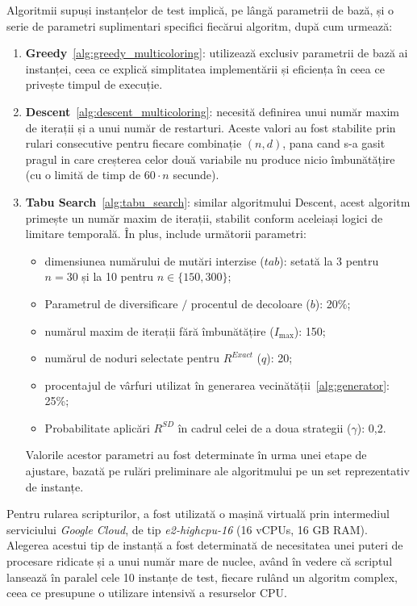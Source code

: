 Algoritmii supuși instanțelor de test implică, pe lângă parametrii de bază, și o serie de parametri suplimentari specifici fiecărui algoritm, după cum urmează:
\begin{enumerate}
  \item \textbf{Greedy}~\ref{alg:greedy_multicoloring}: utilizează exclusiv parametrii de bază ai instanței, ceea ce explică simplitatea implementării și eficiența în ceea ce privește timpul de execuție.

  \item \textbf{Descent}~\ref{alg:descent_multicoloring}: necesită definirea unui număr maxim de iterații și a unui număr de restarturi. Aceste valori au fost stabilite prin rulari consecutive pentru fiecare combinație $(n,d)$, pana cand s-a gasit pragul in care creșterea celor două variabile nu produce nicio îmbunătățire (cu o limită de timp de $60 \cdot n$ secunde).
  \item \textbf{Tabu Search}~\ref{alg:tabu_search}: similar algoritmului Descent, acest algoritm primește un număr maxim de iterații, stabilit conform aceleiași logici de limitare temporală. În plus, include următorii parametri:
  \begin{itemize}
    \item dimensiunea numărului de mutări interzise ($tab$): setată la 3 pentru $n = 30$ și la 10 pentru $n \in \{150, 300\}$;
    \item Parametrul de diversificare $/$ procentul de decoloare ($b$): 20\%;
    \item numărul maxim de iterații fără îmbunătățire ($I_{\max}$): 150;
    \item numărul de noduri selectate pentru $R^{Exact}$ ($q$): 20;
    \item procentajul de vârfuri utilizat în generarea vecinătății~\ref{alg:generator}: 25\%;
    \item Probabilitate aplicări $R^{SD}$ în cadrul celei de a doua strategii ($\gamma$): 0{,}2.
  \end{itemize}
  Valorile acestor parametri au fost determinate în urma unei etape de ajustare, bazată pe rulări preliminare ale algoritmului pe un set reprezentativ de instanțe.
\end{enumerate}


Pentru rularea scripturilor, a fost utilizată o mașină virtuală prin intermediul serviciului \textit{Google Cloud}, de tip \textit{e2-highcpu-16} (16 vCPUs, 16 GB RAM). Alegerea acestui tip de instanță a fost determinată de necesitatea unei puteri de procesare ridicate și a unui număr mare de nuclee, având în vedere că scriptul lansează în paralel cele 10 instanțe de test, fiecare rulând un algoritm complex, ceea ce presupune o utilizare intensivă a resurselor CPU.

